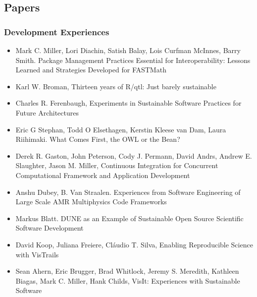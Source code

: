 \documentclass[11pt, oneside]{amsart}
\begin{document}
\subsection*{Papers}

\subsubsection*{Development Experiences}

\begin{itemize}

\item Mark C. Miller, Lori Diachin, Satish Balay, Lois Curfman
  McInnes, Barry Smith. Package Management Practices Essential for
  Interoperability: Lessons Learned and Strategies Developed for
  FASTMath \cite{Miller_WSSSPE}

\item Karl W. Broman, Thirteen years of R/qtl: Just barely sustainable
  \cite{Broman_WSSSPE}

\item Charles R. Ferenbaugh, Experiments in Sustainable Software
  Practices for Future Architectures \cite{Ferenbaugh_WSSSPE}

\item Eric G Stephan, Todd O Elsethagen, Kerstin Kleese van Dam, Laura
  Riihimaki. What Comes First, the OWL or the Bean?
  \cite{Stephan_WSSSPE}

\item Derek R. Gaston, John Peterson, Cody J. Permann, David Andrs,
  Andrew E. Slaughter, Jason M. Miller, Continuous Integration for
  Concurrent Computational Framework and Application Development
  \cite{Gaston_WSSSPE}

\item Anshu Dubey, B. Van Straalen. Experiences from Software
  Engineering of Large Scale AMR Multiphysics Code Frameworks
  \cite{Dubey_WSSSPE}

\item Markus Blatt. DUNE as an Example of Sustainable Open Source
  Scientific Software Development \cite{Blatt_WSSSPE}

\item David Koop, Juliana Freiere, Cl\'{a}udio T. Silva, Enabling
  Reproducible Science with VisTrails~\cite{Koop_WSSSPE}

\item Sean Ahern, Eric Brugger, Brad Whitlock, Jeremy S. Meredith,
  Kathleen Biagas, Mark C. Miller, Hank Childs, VisIt: Experiences
  with Sustainable Software \cite{Ahern_WSSSPE}


\end{itemize}
\end{document}
